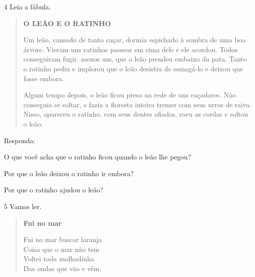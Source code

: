 \num{4} Leia a fábula.


\begin{quote}
\textbf{O LEÃO E O RATINHO}

Um leão, cansado de tanto caçar, dormia espichado à sombra de uma boa
árvore. Vieram uns ratinhos passear em cima dele e ele acordou. Todos
conseguiram fugir, menos um, que o leão prendeu embaixo da pata. Tanto o
ratinho pediu e implorou que o leão desistiu de esmagá-lo e deixou que
fosse embora.

Algum tempo depois, o leão ficou preso na rede de uns caçadores. Não
conseguia se soltar, e fazia a floresta inteira tremer com seus urros de
raiva. Nisso, apareceu o ratinho. com seus dentes afiados, roeu as
cordas e soltou o leão.
\end{quote}


Responda:

\begin{escolha}
\item O que você acha que o ratinho ficou quando o leão lhe pegou?


\item Por que o leão deixou o ratinho ir embora?


\item Por que o ratinho ajudou o leâo?

\end{escolha}

\num{5} Vamos ler.

\begin{verse}
\textbf{Fui no mar}

Fui no mar buscar laranja\\
Coisa que o mar não tem\\
Voltei toda molhadinha\\
Das ondas que vão e vêm.
\end{verse}


